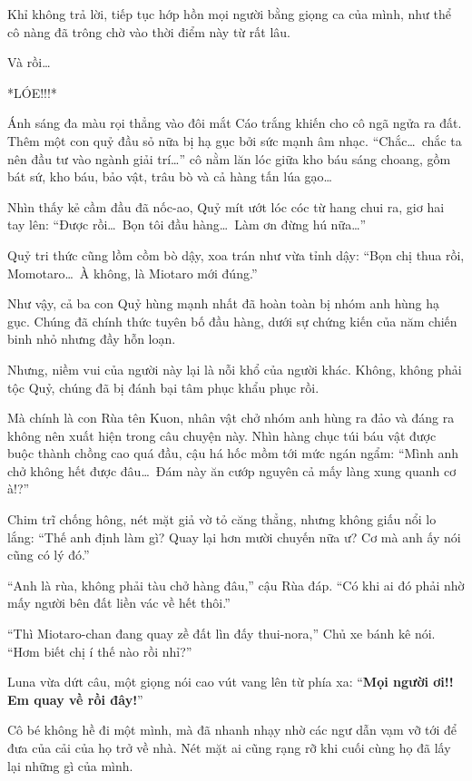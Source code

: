 \documentclass[../main.tex]{subfiles}
\begin{document}
Khỉ không trả lời, tiếp tục hớp hồn mọi người bằng giọng ca của mình, như thể cô nàng đã trông chờ vào thời điểm này từ rất lâu.

Và rồi\dots

*LÓE!!!*

Ánh sáng đa màu rọi thẳng vào đôi mắt Cáo trắng khiến cho cô ngã ngửa ra đất. Thêm một con quỷ đầu sỏ nữa bị hạ gục bởi sức mạnh âm nhạc. ``Chắc\dots\ chắc ta nên đầu tư vào ngành giải trí\dots'' cô nằm lăn lóc giữa kho báu sáng choang, gồm bát sứ, kho báu, bảo vật, trâu bò và cả hàng tấn lúa gạo\dots

Nhìn thấy kẻ cầm đầu đã nốc-ao, Quỷ mít ướt lóc cóc từ hang chui ra, giơ hai tay lên: ``Được rồi\dots\ Bọn tôi đầu hàng\dots\ Làm ơn đừng hú nữa\dots''

Quỷ tri thức cũng lồm cồm bò dậy, xoa trán như vừa tỉnh dậy: ``Bọn chị thua rồi, Momotaro\dots\ À không, là Miotaro mới đúng.''

Như vậy, cả ba con Quỷ hùng mạnh nhất đã hoàn toàn bị nhóm anh hùng hạ gục. Chúng đã chính thức tuyên bố đầu hàng, dưới sự chứng kiến của năm chiến binh nhỏ nhưng đầy hỗn loạn.

\ct

Nhưng, niềm vui của người này lại là nỗi khổ của người khác. Không, không phải tộc Quỷ, chúng đã bị đánh bại tâm phục khẩu phục rồi.

Mà chính là con Rùa tên Kuon, nhân vật chở nhóm anh hùng ra đảo và đáng ra không nên xuất hiện trong câu chuyện này. Nhìn hàng chục túi báu vật được buộc thành chồng cao quá đầu, cậu há hốc mồm tới mức ngán ngẩm: ``Mình anh chở không hết được đâu\dots\ Đám này ăn cướp nguyên cả mấy làng xung quanh cơ à!?''

Chim trĩ chống hông, nét mặt giả vờ tỏ căng thẳng, nhưng không giấu nổi lo lắng: ``Thế anh định làm gì? Quay lại hơn mười chuyến nữa ư? Cơ mà anh ấy nói cũng có lý đó.''

``Anh là rùa, không phải tàu chở hàng đâu,'' cậu Rùa đáp. ``Có khi ai đó phải nhờ mấy người bên đất liền vác về hết thôi.''

``Thì Miotaro-chan đang quay zề đất lìn đấy thui-nora,'' Chủ xe bánh kê nói. ``Hơm biết chị í thế nào rồi nhỉ?''

Luna vừa dứt câu, một giọng nói cao vút vang lên từ phía xa: ``\textbf{Mọi người ơi!! Em quay về rồi đây!}''

Cô bé không hề đi một mình, mà đã nhanh nhạy nhờ các ngư dẫn vạm vỡ tới để đưa của cải của họ trở về nhà. Nét mặt ai cũng rạng rỡ khi cuối cùng họ đã lấy lại những gì của mình.
\end{document}
